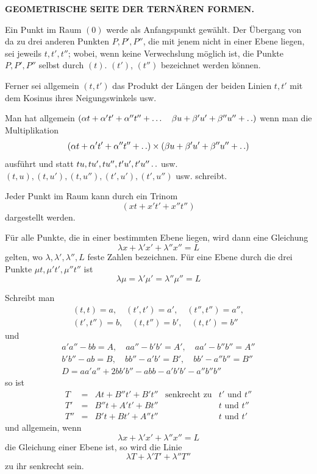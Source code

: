 \clearpage
\renewcommand{\BookRunningTitle}{Geometrische Seite der ternären Formen}
\begin{center}\Large\bfseries GEOMETRISCHE SEITE DER TERNÄREN FORMEN.\end{center}
\BookRule{30mm}

Ein Punkt im Raum $(0)$ werde als Anfangspunkt gewählt. Der Übergang von da zu drei anderen Punkten $P,P',P''$, die mit jenem nicht in einer Ebene liegen, sei jeweils $t,t',t''$; wobei, wenn keine Verwechslung möglich ist, die Punkte $P,P',P''$ selbst durch $(t)$. $(t')$, $(t'')$ bezeichnet werden können.

Ferner sei allgemein $(t,t')$ das Produkt der Längen der beiden Linien $t,t'$ mit dem Kosinus ihres Neigungswinkels usw.

Man hat allgemein $(\alpha t+\alpha't'+\alpha''t''+\ldots\quad\beta u+\beta'u'+\beta''u''+\mathinner{.\,.})$ wenn man die Multiplikation
\[
(\alpha t+\alpha't'+\alpha''t''+\mathinner{.\,.})\times(\beta u+\beta'u'+\beta''u''+\mathinner{.\,.})
\]
ausführt und statt $tu,\allowbreak tu',\allowbreak tu'',\allowbreak t'u',\allowbreak t'u''\mathinner{.\,.}$ usw. $(t,u),\allowbreak(t,u'),\allowbreak(t,u''),\allowbreak(t',u'),\allowbreak(t',u'')$ usw. schreibt.

Jeder Punkt im Raum kann durch ein Trinom
\[
(xt+x't'+x''t'')
\]
dargestellt werden.

Für alle Punkte, die in einer bestimmten Ebene liegen, wird dann eine Gleichung
\[
\lambda x+\lambda'x'+\lambda''x''=L
\]
gelten, wo $\lambda,\lambda',\lambda'',L$ feste Zahlen bezeichnen. Für eine Ebene durch die drei Punkte $\mu t,\mu't',\mu''t''$ ist
\[
\lambda\mu=\lambda'\mu'=\lambda''\mu''=L
\]

Schreibt man
\[
\begin{gathered}
(t,t)=a,\quad(t',t')=a',\quad(t'',t'')=a'',\\
(t',t'')=b,\quad(t,t'')=b',\quad(t,t')=b''
\end{gathered}
\]
und
\[
\begin{gathered}
a'a''-bb=A,\quad aa''-b'b'=A',\quad aa'-b''b''=A''\\
b'b''-ab=B,\quad bb''-a'b'=B',\quad bb'-a''b''=B''\\
D=aa'a''+2bb'b''-abb-a'b'b'-a''b''b''
\end{gathered}
\]
so ist
\[
\begin{array}{rclll}
T&=&At+B''t'+B't''&\text{senkrecht zu}&t'\text{ und }t''\\
T'&=&B''t+A't'+Bt''&&t\text{ und }t''\\
T''&=&B't+Bt'+A''t''&&t\text{ und }t'
\end{array}
\]
und allgemein, wenn
\[
\lambda x+\lambda'x'+\lambda''x''=L
\]
die Gleichung einer Ebene ist, so wird die Linie
\[
\lambda T+\lambda'T'+\lambda''T''
\]
zu ihr senkrecht sein.

